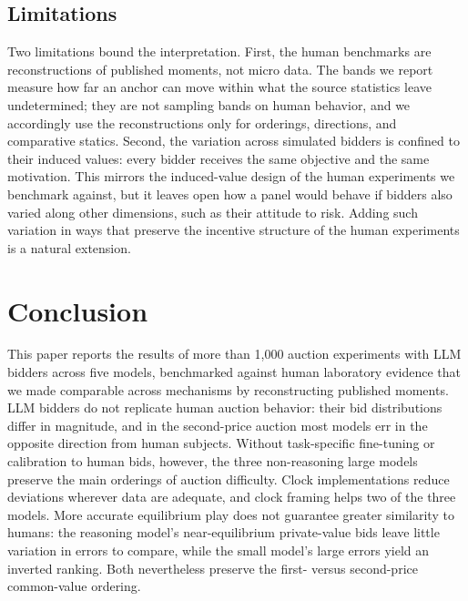 \documentclass[acmsmall,screen,review]{acmart}
\begin{document}
\subsection{\texorpdfstring{Limitations}{Limitations}}

Two limitations bound the interpretation. First, the human benchmarks are reconstructions of published moments, not micro data. The bands we report measure how far an anchor can move within what the source statistics leave undetermined; they are not sampling bands on human behavior, and we accordingly use the reconstructions only for orderings, directions, and comparative statics. Second, the variation across simulated bidders is confined to their induced values: every bidder receives the same objective and the same motivation. This mirrors the induced-value design of the human experiments we benchmark against, but it leaves open how a panel would behave if bidders also varied along other dimensions, such as their attitude to risk. Adding such variation in ways that preserve the incentive structure of the human experiments is a natural extension.


\section{Conclusion}\label{sec:conclusion}

This paper reports the results of more than 1,000 auction experiments with LLM bidders across five models, benchmarked against human laboratory evidence that we made comparable across mechanisms by reconstructing published moments. LLM bidders do not replicate human auction behavior: their bid distributions differ in magnitude, and in the second-price auction most models err in the opposite direction from human subjects. Without task-specific fine-tuning or calibration to human bids, however, the three non-reasoning large models preserve the main orderings of auction difficulty. Clock implementations reduce deviations wherever data are adequate, and clock framing helps two of the three models. More accurate equilibrium play does not guarantee greater similarity to humans: the reasoning model's near-equilibrium private-value bids leave little variation in errors to compare, while the small model's large errors yield an inverted ranking. Both nevertheless preserve the first- versus second-price common-value ordering.
\end{document}
